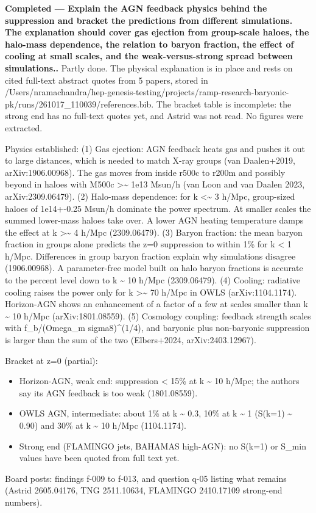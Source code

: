 \documentclass[11pt,a4paper]{article}
\begin{document}
\textbf{Completed --- Explain the AGN feedback physics behind the suppression and bracket the predictions from different simulations. The explanation should cover gas ejection from group-scale haloes, the halo-mass dependence, the relation to baryon fraction, the effect of cooling at small scales, and the weak-versus-strong spread between simulations..} Partly done. The physical explanation is in place and rests on cited full-text abstract quotes from 5 papers, stored in /Users/nramachandra/hep-genesis-testing/projects/ramp-research-baryonic-pk/runs/261017\_110039/references.bib. The bracket table is incomplete: the strong end has no full-text quotes yet, and Astrid was not read. No figures were extracted.

Physics established: (1) Gas ejection: AGN feedback heats gas and pushes it out to large distances, which is needed to match X-ray groups (van Daalen+2019, arXiv:1906.00968). The gas moves from inside r500c to r200m and possibly beyond in haloes with M500c \textgreater{}\textasciitilde{} 1e13 Msun/h (van Loon and van Daalen 2023, arXiv:2309.06479). (2) Halo-mass dependence: for k \textless{}\textasciitilde{} 3 h/Mpc, group-sized haloes of 1e14+-0.25 Msun/h dominate the power spectrum. At smaller scales the summed lower-mass haloes take over. A lower AGN heating temperature damps the effect at k \textgreater{}\textasciitilde{} 4 h/Mpc (2309.06479). (3) Baryon fraction: the mean baryon fraction in groups alone predicts the z=0 suppression to within 1\% for k \textless{} 1 h/Mpc. Differences in group baryon fraction explain why simulations disagree (1906.00968). A parameter-free model built on halo baryon fractions is accurate to the percent level down to k \textasciitilde{} 10 h/Mpc (2309.06479). (4) Cooling: radiative cooling raises the power only for k \textgreater{}\textasciitilde{} 70 h/Mpc in OWLS (arXiv:1104.1174). Horizon-AGN shows an enhancement of a factor of a few at scales smaller than k \textasciitilde{} 10 h/Mpc (arXiv:1801.08559). (5) Cosmology coupling: feedback strength scales with f\_b/(Omega\_m sigma8)\textasciicircum{}(1/4), and baryonic plus non-baryonic suppression is larger than the sum of the two (Elbers+2024, arXiv:2403.12967).

Bracket at z=0 (partial):

\begin{itemize}
  \item Horizon-AGN, weak end: suppression \textless{} 15\% at k \textasciitilde{} 10 h/Mpc; the authors say its AGN feedback is too weak (1801.08559).
  \item OWLS AGN, intermediate: about 1\% at k \textasciitilde{} 0.3, 10\% at k \textasciitilde{} 1 (S(k=1) \textasciitilde{} 0.90) and 30\% at k \textasciitilde{} 10 h/Mpc (1104.1174).
  \item Strong end (FLAMINGO jets, BAHAMAS high-AGN): no S(k=1) or S\_min values have been quoted from full text yet.
\end{itemize}
Board posts: findings f-009 to f-013, and question q-05 listing what remains (Astrid 2605.04176, TNG 2511.10634, FLAMINGO 2410.17109 strong-end numbers).
\end{document}
